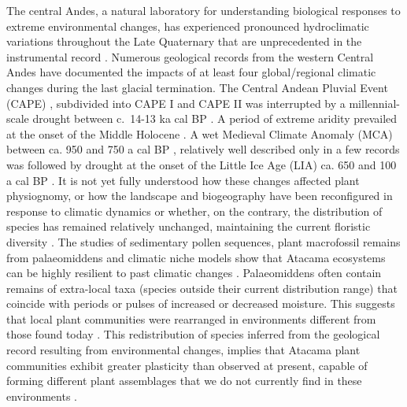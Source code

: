 \documentclass[
  authoryear,
  preprint,
  3p]{elsarticle}
\begin{document}
The central Andes, a natural laboratory for understanding biological
responses to extreme environmental changes, has experienced pronounced
hydroclimatic variations throughout the Late Quaternary that are
unprecedented in the instrumental record
\citep{arroyoPlantPhenologicalPatterns1981, betancourt22000YearRecord2000, grosjeanMidHoloceneClimateSouthCentral2001, latorreVegetationInvasionsAbsolute2002, rechLateQuaternaryPaleohydrology2002, gayoLateQuaternaryHydrological2012, strikisSouthAmericanMonsoon2018, rodbell700000Years2022}.
Numerous geological records from the western Central Andes have
documented the impacts of at least four global/regional climatic changes
during the last glacial termination. The Central Andean Pluvial Event
(CAPE)
\citep{latorreLateQuaternaryVegetation2006, nesterPerennialStreamDischarge2007, quadePaleowetlandsRegionalClimate2008, martinLakeTaucaHighstand2018},
subdivided into CAPE I \citep[from ca. 18 and 14 ka cal
BP,][]{gayoLateQuaternaryHydrological2012} and CAPE II \citep[ca. 13 to
9 ka cal BP,][]{quadePaleowetlandsRegionalClimate2008} was interrupted
by a millennial-scale drought between c.~14-13 ka cal BP
\citep{workmanLandscapeEvolutionEnvironmental2020}. A period of extreme
aridity prevailed at the onset of the Middle Holocene \citep[ca. 8-7 and
5-4 ka cal
BP,][]{grosjeanLateglacialEarlyMiddle1994, valero-garcesLimnogeologyLagunaMiscanti1996, gonzalez-pinillaHighLowlatitudeForcings2021}.
A wet Medieval Climate Anomaly (MCA) between ca. 950 and 750 a cal BP
\citep{luningMedievalClimateAnomaly2019}, relatively well described only
in a few records was followed by drought at the onset of the Little Ice
Age (LIA) ca. 650 and 100 a cal BP
\citep{rabatelChronologyLittleIce2008b, gonzalez-pinillaHighLowlatitudeForcings2021}.
It is not yet fully understood how these changes affected plant
physiognomy, or how the landscape and biogeography have been
reconfigured in response to climatic dynamics or whether, on the
contrary, the distribution of species has remained relatively unchanged,
maintaining the current floristic diversity
\citep{diazRodentMiddensReveal2012}. The studies of sedimentary pollen
sequences, plant macrofossil remains from palaeomiddens and climatic
niche models show that Atacama ecosystems can be highly resilient to
past climatic changes
\citep{latorreVegetationInvasionsAbsolute2002, anjosMeasuringResilienceAssessing2018, diazMultiscaleClimateChange2019}.
Palaeomiddens often contain remains of extra-local taxa (species outside
their current distribution range) that coincide with periods or pulses
of increased or decreased moisture. This suggests that local plant
communities were rearranged in environments different from those found
today \citep{latorreVegetationInvasionsAbsolute2002}. This
redistribution of species inferred from the geological record resulting
from environmental changes, implies that Atacama plant communities
exhibit greater plasticity than observed at present, capable of forming
different plant assemblages that we do not currently find in these
environments
\citep{stotzGlobalTrendsPhenotypic2021, navarroPhenotypicPlasticitySelection2022}.
\end{document}
